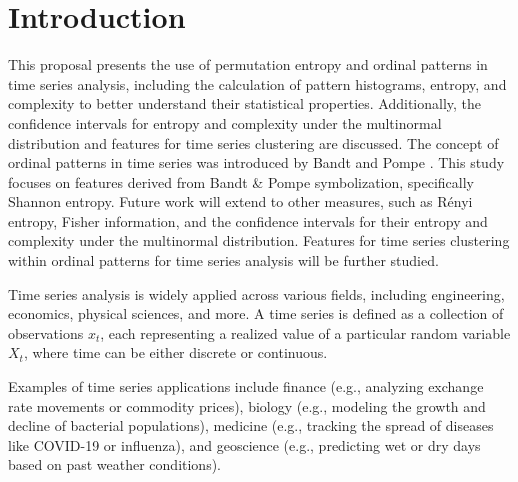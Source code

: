 \chapter{Introduction}\label{C:intro}

This proposal presents the use of permutation entropy and ordinal patterns in time series analysis, including the calculation of pattern histograms, entropy, and complexity to better understand their statistical properties. Additionally, the confidence intervals for entropy and complexity under the multinormal distribution and features for time series clustering are discussed. The concept of ordinal patterns in time series was introduced by Bandt and Pompe \cite{PhysRevLett.88.174102}. This study focuses on features derived from Bandt \& Pompe symbolization, specifically Shannon entropy. Future work will extend to other measures, such as Rényi entropy, Fisher information, and the confidence intervals for their entropy and complexity under the multinormal distribution. Features for time series clustering within ordinal patterns for time series analysis will be further studied.

Time series analysis is widely applied across various fields, including engineering, economics, physical sciences, and more. A time series is defined as a collection of observations ${x_t}$, each representing a realized value of a particular random variable $X_t$, where time can be either discrete or continuous.

Examples of time series applications include finance (e.g., analyzing exchange rate movements or commodity prices), biology (e.g., modeling the growth and decline of bacterial populations), medicine (e.g., tracking the spread of diseases like COVID-19 or influenza), and geoscience (e.g., predicting wet or dry days based on past weather conditions).

